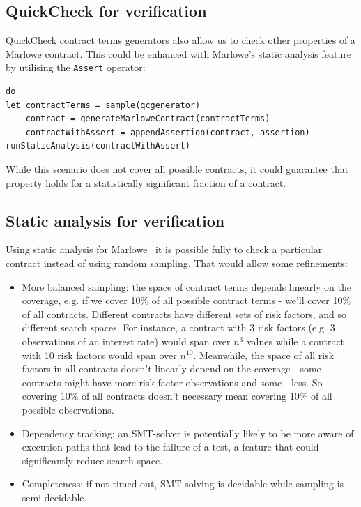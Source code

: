 \documentclass[runningheads]{llncs}
\begin{document}
\subsection{QuickCheck for verification}

QuickCheck contract terms generators also allow us to check
other properties of a Marlowe contract. This could be enhanced
with Marlowe's static analysis feature by utilising the \texttt{Assert} operator:

\begin{verbatim}
do
let contractTerms = sample(qcgenerator) 
    contract = generateMarloweContract(contractTerms) 
    contractWithAssert = appendAssertion(contract, assertion) 
runStaticAnalysis(contractWithAssert)
\end{verbatim}

While this scenario does not cover all possible contracts, it could guarantee that
property holds for a statistically significant fraction of a contract.

\subsection{Static analysis for verification}

Using static analysis for Marlowe~\cite{marlowe-efficient} it is possible fully to check a particular contract instead of using random
sampling. That would allow some refinements: 
\begin{itemize}
\item More balanced sampling: the space of contract terms depends linearly on
the coverage, e.g. if we cover 10\% of all possible contract terms
- we'll cover 10\% of all contracts. Different contracts have different
sets of risk factors, and so different search spaces. For instance, a
contract with 3 risk factors (e.g. 3 observations of an interest rate)
would span over $n^3$ values while a contract with 10 risk
factors would span over $n^{10}$. Meanwhile, the space of
all risk factors in all contracts doesn't linearly depend on the coverage - 
some contracts might have more risk factor observations and some - less. 
So covering 10\% of all contracts doesn't necessary mean covering 10\% of all possible observations.
\item Dependency tracking: an SMT-solver is potentially likely to be more aware of execution
paths that lead to the failure of a test, a feature that could significantly reduce
search space. 
\item Completeness: if not timed out, SMT-solving is decidable while sampling
is semi-decidable. 
\end{itemize}
\end{document}
